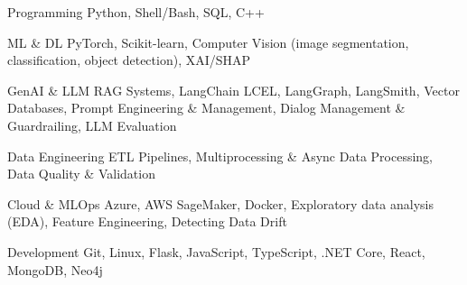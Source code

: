 

\begin{cvskills}


\cvskill
    {Programming} %
    {Python, Shell/Bash, SQL, C++} %


\cvskill
    {ML \& DL}
    {PyTorch, Scikit-learn, Computer Vision (image segmentation, classification, object detection), XAI/SHAP}


\cvskill
    {GenAI \& LLM}
    {RAG Systems, LangChain LCEL, LangGraph, LangSmith, Vector Databases, Prompt Engineering \& Management, Dialog Management \& Guardrailing, LLM Evaluation}



\cvskill
    {Data Engineering}
    {ETL Pipelines, Multiprocessing \& Async Data Processing, Data Quality \& Validation}
    

\cvskill
    {Cloud \& MLOps}
    {Azure, AWS SageMaker, Docker, Exploratory data analysis (EDA), Feature Engineering, Detecting Data Drift}

    

\cvskill
    {Development}
    {Git, Linux, Flask, JavaScript, TypeScript, .NET Core, React, MongoDB, Neo4j}





    
\end{cvskills}

